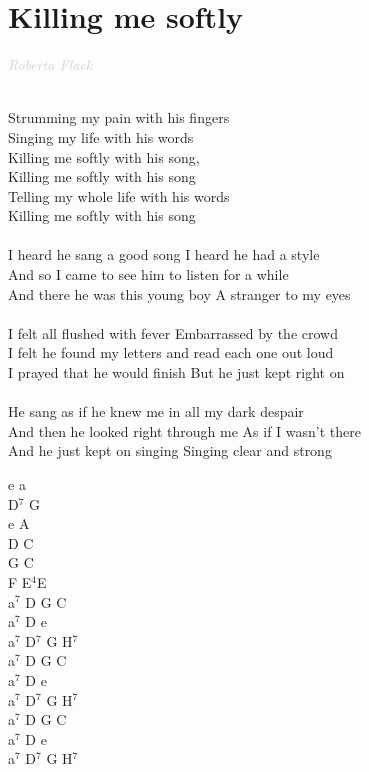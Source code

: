 \documentclass[a5paper, 10pt]{book}
\begin{document}
\section{Killing me softly}\textcolor{lightgray}{\textit{Roberta Flack}}\\~\\
\begin{minipage}[t]{0.75\textwidth}
\hspace*{5mm}Strumming my pain with his fingers \\
\hspace*{5mm}Singing my life with his words\\
\hspace*{5mm}Killing me softly with his song, \\
\hspace*{5mm}Killing me softly with his song \\
\hspace*{5mm}Telling my whole life with his words \\
\hspace*{5mm}Killing me softly with his song\\
\\
I heard he sang a good song I heard he had a style\\
And so I came to see him to listen for a while\\
And there he was this young boy A stranger to my eyes\\
\\
I felt all flushed with fever Embarrassed by the crowd\\
I felt he found my letters and read each one out loud\\
I prayed that he would finish But he just kept right on\\
 \\
He sang as if he knew me in all my dark despair \\
And then he looked right through me As if I wasn't there \\
And he just kept on singing Singing clear and strong \\
 
\end{minipage}
\begin{minipage}[t]{0.25\textwidth}
e a\\
D$^7$ G\\
e A\\
D C\\
G C\\
F E$^4$E\\

a$^7$ D G C\\
a$^7$ D e\\
a$^7$ D$^7$ G H$^7$\\

a$^7$ D G C\\
a$^7$ D e\\
a$^7$ D$^7$ G H$^7$\\

a$^7$ D G C\\
a$^7$ D e\\
a$^7$ D$^7$ G H$^7$\\
\end{minipage}
\end{document}
